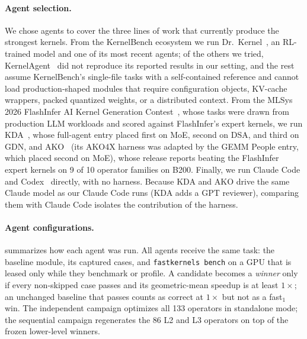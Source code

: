 \paragraph{Agent selection.}
We chose agents to cover the three lines of work that currently produce the strongest kernels.
From the KernelBench ecosystem we run Dr.~Kernel~\citep{drkernel}, an RL-trained model and one of its most recent agents; of the others we tried, KernelAgent~\citep{kernelagent} did not reproduce its reported results in our setting, and the rest assume KernelBench's single-file tasks with a self-contained reference and cannot load production-shaped modules that require configuration objects, KV-cache wrappers, packed quantized weights, or a distributed context.
From the MLSys 2026 FlashInfer AI Kernel Generation Contest~\citep{mlsys26contest}, whose tasks were drawn from production LLM workloads and scored against FlashInfer's expert kernels, we run KDA~\citep{kda}, whose full-agent entry placed first on MoE, second on DSA, and third on GDN, and AKO~\citep{ako} (its AKO4X harness was adapted by the GEMM People entry, which placed second on MoE), whose release reports beating the FlashInfer expert kernels on 9 of 10 operator families on B200.
Finally, we run Claude Code and Codex~\citep{codex} directly, with no harness.
Because KDA and AKO drive the same Claude model as our Claude Code runs (KDA adds a GPT reviewer), comparing them with Claude Code isolates the contribution of the harness.

\paragraph{Agent configurations.}
 summarizes how each agent was run.
All agents receive the same task: the baseline module, its captured cases, and \texttt{fastkernels bench} on a GPU that is leased only while they benchmark or profile.
A candidate becomes a \emph{winner} only if every non-skipped case passes and its geometric-mean speedup is at least $1\times$; an unchanged baseline that passes counts as correct at $1\times$ but not as a fast$_1$ win.
The independent campaign optimizes all 133 operators in standalone mode; the sequential campaign regenerates the 86 L2 and L3 operators on top of the frozen lower-level winners.

